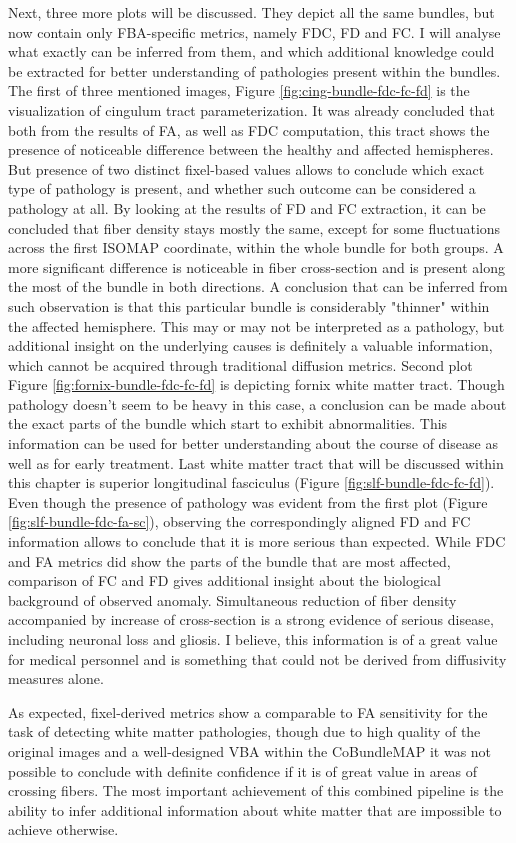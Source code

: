 \documentclass[thesis.tex]{subfiles}
\begin{document}
Next, three more plots will be discussed. They depict all the same bundles, but now contain only FBA-specific metrics, namely FDC, FD and FC. I will analyse what exactly can be inferred from them, and which additional knowledge could be extracted for better understanding of pathologies present within the bundles. The first of three mentioned images, Figure \ref{fig:cing-bundle-fdc-fc-fd} is the visualization of cingulum tract parameterization. It was already concluded that both from the results of FA, as well as FDC computation, this tract shows the presence of noticeable difference between the healthy and affected hemispheres. But presence of two distinct fixel-based values allows to conclude which exact type of pathology is present, and whether such outcome can be considered a pathology at all. By looking at the results of FD and FC extraction, it can be concluded that fiber density stays mostly the same, except for some fluctuations across the first ISOMAP coordinate, within the whole bundle for both groups. A more significant difference is noticeable in fiber cross-section and is present along the most of the bundle in both directions. A conclusion that can be inferred from such observation is that this particular bundle is considerably "thinner" within the affected hemisphere. This may or may not be interpreted as a pathology, but additional insight on the underlying causes is definitely a valuable information, which cannot be acquired through traditional diffusion metrics. Second plot Figure \ref{fig:fornix-bundle-fdc-fc-fd} is depicting fornix white matter tract. Though pathology doesn't seem to be heavy in this case, a conclusion can be made about the exact parts of the bundle which start to exhibit abnormalities. This information can be used for better understanding about the course of disease as well as for early treatment. Last white matter tract that will be discussed within this chapter is superior longitudinal fasciculus (Figure \ref{fig:slf-bundle-fdc-fc-fd}). Even though the presence of pathology was evident from the first plot (Figure \ref{fig:slf-bundle-fdc-fa-sc}), observing the correspondingly aligned FD and FC information allows to conclude that it is more serious than expected. While FDC and FA metrics did show the parts of the bundle that are most affected, comparison of FC and FD gives additional insight about the biological background of observed anomaly. Simultaneous reduction of fiber density accompanied by increase of cross-section is a strong evidence of serious disease, including neuronal loss and gliosis. I believe, this information is of a great value for medical personnel and is something that could not be derived from diffusivity measures alone.

As expected, fixel-derived metrics show a comparable to FA sensitivity for the task of detecting white matter pathologies, though due to high quality of the original images and a well-designed VBA within the CoBundleMAP it was not possible to conclude with definite confidence if it is of great value in areas of crossing fibers. The most important achievement of this combined pipeline is the ability to infer additional information about white matter that are impossible to achieve otherwise.
\end{document}
